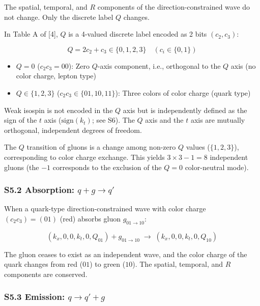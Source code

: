 \documentclass[
  a4paper,11pt]{article}
\providecommand{\tightlist}{%
  \setlength{\itemsep}{0pt}\setlength{\parskip}{0pt}}
\theoremstyle{definition}
\theoremstyle{remark}
\begin{document}
The spatial, temporal, and \(R\) components of the direction-constrained
wave do not change. Only the discrete label \(Q\) changes.

In Table A of {[}4{]}, \(Q\) is a 4-valued discrete label encoded as 2
bits \((c_2, c_3)\):

\[Q = 2c_2 + c_3 \in \{0, 1, 2, 3\} \quad (c_i \in \{0, 1\})\]

\begin{itemize}
\tightlist
\item
  \(Q = 0\) (\(c_2 c_3 = 00\)): Zero \(Q\)-axis component, i.e.,
  orthogonal to the \(Q\) axis (no color charge, lepton type)
\item
  \(Q \in \{1, 2, 3\}\) (\(c_2 c_3 \in \{01, 10, 11\}\)): Three colors
  of color charge (quark type)
\end{itemize}

Weak isospin is not encoded in the \(Q\) axis but is independently
defined as the sign of the \(t\) axis (\(\mathrm{sign}(k_t)\); see S6).
The \(Q\) axis and the \(t\) axis are mutually orthogonal, independent
degrees of freedom.

The \(Q\) transition of gluons is a change among non-zero \(Q\) values
(\(\{1, 2, 3\}\)), corresponding to color charge exchange. This yields
\(3 \times 3 - 1 = 8\) independent gluons (the \(-1\) corresponds to the
exclusion of the \(Q = 0\) color-neutral mode).

\subsubsection{\texorpdfstring{S5.2 Absorption:
\(q + g \to q'\)}{S5.2 Absorption: q + g \textbackslash to q\textquotesingle{}}}\label{s5.2-absorption-q-g-to-q}

When a quark-type direction-constrained wave with color charge
\((c_2 c_3) = (01)\) (red) absorbs gluon \(g_{01 \to 10}\):

\[(k_x, 0, 0, k_t, 0, Q_{01}) + g_{01 \to 10} \;\longrightarrow\; (k_x, 0, 0, k_t, 0, Q_{10})\]

The gluon ceases to exist as an independent wave, and the color charge
of the quark changes from red (\(01\)) to green (\(10\)). The spatial,
temporal, and \(R\) components are conserved.

\subsubsection{\texorpdfstring{S5.3 Emission:
\(q \to q' + g\)}{S5.3 Emission: q \textbackslash to q\textquotesingle{} + g}}\label{s5.3-emission-q-to-q-g}
\end{document}
